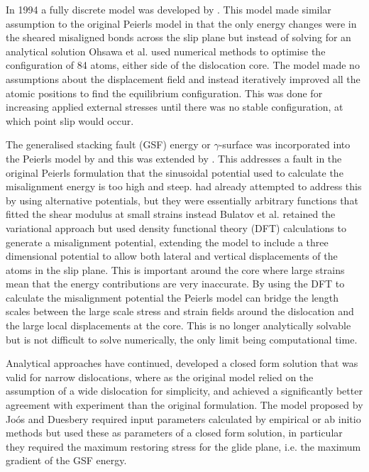 In 1994 a fully discrete model was developed by \citet{Ohsawa1994}. This model made similar assumption to the original Peierls model in that the only energy changes were in the sheared misaligned bonds across the slip plane but instead of solving for an analytical solution Ohsawa et al. used numerical methods to optimise the configuration of 84 atoms,  either side of the dislocation core. The model made no assumptions about the displacement field and instead iteratively improved all the atomic positions to find the equilibrium configuration. This was done for increasing applied external stresses until there was no stable configuration, at which point slip would occur.





The generalised stacking fault (GSF) energy or $\gamma$-surface was incorporated into the Peierls model by \citet{Vitek1992} and this was extended by \citet{Bulatov1997}. This addresses a fault in the original Peierls formulation that the sinusoidal potential used to calculate the misalignment energy is too high and steep. \citet{Ohsawa1994} had already attempted to address this by using alternative potentials, but they were essentially arbitrary functions that fitted the shear modulus at small strains instead Bulatov et al. retained the variational approach but used density functional theory (DFT) calculations to generate a misalignment potential, extending the model to include a three dimensional potential to allow both lateral and vertical displacements of the atoms in the slip plane. This is important around the core where large strains mean that the energy contributions are very inaccurate. By using the DFT to calculate the misalignment potential the Peierls model can bridge the length scales between the large scale stress and strain fields around the dislocation and the large local displacements at the core. This is no longer analytically solvable but is not difficult to solve numerically, the only limit being computational time.

Analytical approaches have continued, \citet{Joos1997} developed a closed form solution that was valid for narrow dislocations, where as the original model relied on the assumption of a wide dislocation for simplicity, and achieved a significantly better agreement with experiment than the original formulation. The model proposed by Joós and Duesbery required input parameters calculated by empirical or ab initio methods but used these as parameters of a closed form solution, in particular they required the maximum restoring stress for the glide plane, i.e. the maximum gradient of the GSF energy.

